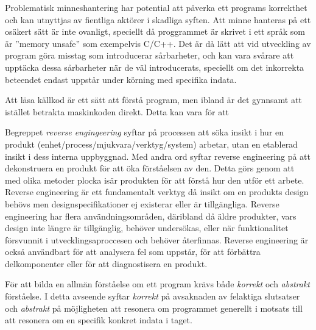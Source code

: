 Problematisk minneshantering har potential att påverka ett programs korrekthet och
kan utnyttjas av fientliga aktörer i skadliga syften. Att minne hanteras på ett
osäkert sätt är inte ovanligt, speciellt då proggrammet är skrivet i ett språk som är
''memory unsafe'' som exempelvis C/C++. Det är då lätt att vid utveckling av program
göra misstag som introducerar sårbarheter, och kan vara svårare att upptäcka dessa
sårbarheter när de väl introducerats, speciellt om det inkorrekta beteendet endast
uppstår under körning med specifika indata.

Att läsa källkod är ett sätt att förstå program, men ibland är det gynnsamt att istället betrakta
maskinkoden direkt. Detta kan vara för att

Begreppet \textit{reverse engingeering} syftar på processen att söka insikt i hur en produkt
(enhet/process/mjukvara/verktyg/system) arbetar, utan en etablerad insikt i dess interna
uppbyggnad. Med andra ord syftar reverse engineering på att dekonstruera en produkt för att
öka förståelsen av den. Detta görs genom att med olika metoder plocka isär produkten för
att förstå hur den utför ett arbete. Reverse engineering är ett fundamentalt verktyg då insikt
om en produkts design behövs men designspecifikationer ej existerar eller är tillgängliga.
Reverse engineering har flera användningsområden, däribland då äldre produkter, vars design
inte längre är tillgänglig, behöver undersökas, eller när funktionalitet försvunnit i
utvecklingsaproccesen och behöver återfinnas. Reverse engineering är också användbart för
att analysera fel som uppstår, för att förbättra delkomponenter eller för att diagnostisera
en produkt.

För att bilda en allmän förståelse om ett program krävs både \textit{korrekt} och
\textit{abstrakt} förståelse. I detta avseende syftar \textit{korrekt} på
avsaknaden av felaktiga slutsatser och \textit{abstrakt} på möjligheten att
resonera om programmet generellt i motsats till att resonera om en specifik
konkret indata i taget.


